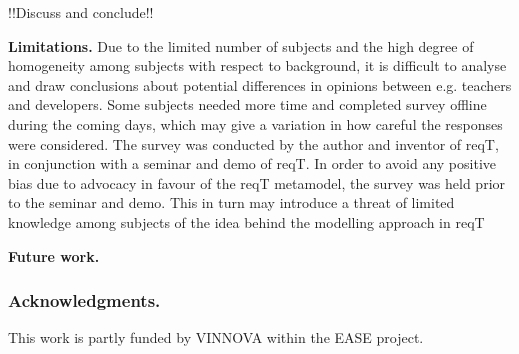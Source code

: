 \documentclass[a4paper]{llncs}
\begin{document}
!!Discuss and conclude!!



{\bf Limitations. } Due to the limited number of subjects and the high degree of homogeneity among subjects with respect to background, it is difficult to analyse and draw conclusions about potential differences in opinions between e.g. teachers and developers. Some subjects needed more time and completed survey offline during the coming days, which may give a variation in how careful the responses were considered. The survey was conducted by the author and inventor of reqT, in conjunction with a seminar and demo of reqT. In order to avoid any positive bias due to advocacy in favour of the reqT metamodel, the survey was held prior to the seminar and demo. This in turn may introduce a threat of limited knowledge among subjects of the idea behind the modelling approach in reqT 
 
{\bf Future work.} %



\subsubsection*{Acknowledgments.} This work is partly funded by  VINNOVA within the EASE project.




\clearpage
\end{document}
